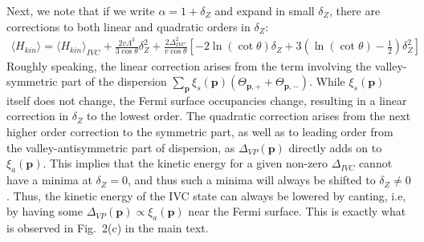 \documentclass[aps,pra,twocolumn,superscriptaddress,10pt,article,nofootinbib,showpacs,longbibliography]{revtex4-1}
\def \p{{\mathbf p}}
\def \beq{\begin{eqnarray}}
\def \eeq{\end{eqnarray}}
\begin{document}
Next, we note that if we write $\alpha = 1 + \delta_Z$ and expand in small $\delta_Z$, there are corrections to both linear and quadratic orders in $\delta_Z$:
\beq
\langle H_{kin} \rangle = \langle H_{kin} \rangle_{IVC} + \frac{2v\Lambda^3}{3 \cos \theta} \delta_Z^2 +  \frac{2 \Delta_{IVC}^2}{v \cos\theta} \left[ -2 \ln(\cot \theta) \delta_Z + 3\left( \ln(\cot \theta) - \frac{1}{2} \right)\delta_Z^2  \right]
\eeq
Roughly speaking, the linear correction arises from the term involving the valley-symmetric part of the dispersion $\sum_\p \xi_s(\p) (\Theta_{\p,+} + \Theta_{\p,-})$. While $\xi_s(\p)$ itself does not change, the Fermi surface occupancies change, resulting in a linear correction in $\delta_Z$ to the lowest order. 
The quadratic correction arises from the next higher order correction to the symmetric part, as well as to leading order from the valley-antisymmetric part of dispersion, as $\Delta_{VP}(\p)$ directly adds on to $\xi_a(\p)$. 
This implies that the kinetic energy for a given non-zero $\Delta_{IVC}$ cannot have a minima at $\delta_Z = 0$, and thus such a minima will always be shifted to $\delta_Z \neq 0$. 
Thus, the kinetic energy of the IVC state can always be lowered by canting, i.e, by having some $\Delta_{VP}(\p) \propto \xi_a(\p)$ near the Fermi surface. 
This is exactly what is observed in Fig.~2(c) in the main text.
\end{document}
